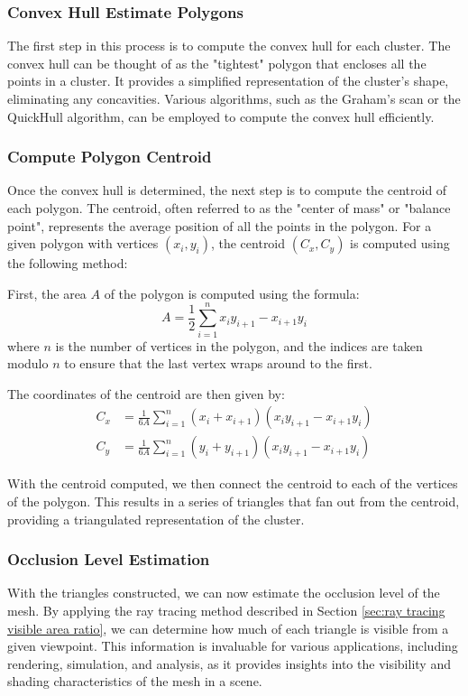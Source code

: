 \documentclass[11pt, a4paper,oneside,chapterprefix=false]{scrbook}
\begin{document}
\subsubsection{Convex Hull Estimate Polygons}

The first step in this process is to compute the convex hull for each cluster. The convex hull can be thought of as the "tightest" polygon that encloses all the points in a cluster. It provides a simplified representation of the cluster's shape, eliminating any concavities. Various algorithms, such as the Graham's scan or the QuickHull algorithm, can be employed to compute the convex hull efficiently.

\subsubsection{Compute Polygon Centroid}

Once the convex hull is determined, the next step is to compute the centroid of each polygon. The centroid, often referred to as the "center of mass" or "balance point", represents the average position of all the points in the polygon. For a given polygon with vertices \( (x_i, y_i) \), the centroid \( (C_x, C_y) \) is computed using the following method:

First, the area \( A \) of the polygon is computed using the formula:
\[ A = \frac{1}{2} \sum_{i=1}^{n} x_i y_{i+1} - x_{i+1} y_i \]
where \( n \) is the number of vertices in the polygon, and the indices are taken modulo \( n \) to ensure that the last vertex wraps around to the first.

The coordinates of the centroid are then given by:
\begin{align*}
C_x &= \frac{1}{6A} \sum_{i=1}^{n} (x_i + x_{i+1}) (x_i y_{i+1} - x_{i+1} y_i) \\
C_y &= \frac{1}{6A} \sum_{i=1}^{n} (y_i + y_{i+1}) (x_i y_{i+1} - x_{i+1} y_i)
\end{align*}

With the centroid computed, we then connect the centroid to each of the vertices of the polygon. This results in a series of triangles that fan out from the centroid, providing a triangulated representation of the cluster.


\subsubsection{Occlusion Level Estimation}

With the triangles constructed, we can now estimate the occlusion level of the mesh. By applying the ray tracing method described in Section \ref{sec:ray tracing visible area ratio}, we can determine how much of each triangle is visible from a given viewpoint. This information is invaluable for various applications, including rendering, simulation, and analysis, as it provides insights into the visibility and shading characteristics of the mesh in a scene.
\end{document}
